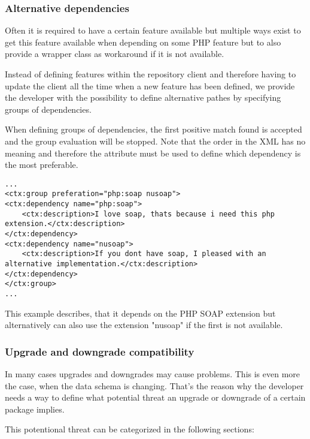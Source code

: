 \subsubsection[sec:alternative dependencies]{Alternative dependencies}
Often it is required to have a certain feature available but multiple ways exist to get this feature available when depending on some PHP feature but to also provide a wrapper class as workaround if it is not available.

Instead of defining features within the repository client and therefore having to update the client all the time when a new feature has been defined, we provide the developer with the possibility to define alternative pathes by specifying groups of dependencies.

When defining groups of dependencies, the first positive match found is accepted and the group evaluation will be stopped. Note that the order in the XML has no meaning and therefore the attribute  must be used to define which dependency is the most preferable.

\lstset{language=XML} 
\begin{lstlisting}[caption=XML example: alternative relationships]
...
<ctx:group preferation="php:soap nusoap">
<ctx:dependency name="php:soap">
    <ctx:description>I love soap, thats because i need this php extension.</ctx:description>
</ctx:dependency>
<ctx:dependency name="nusoap">
    <ctx:description>If you dont have soap, I pleased with an alternative implementation.</ctx:description>
</ctx:dependency>
</ctx:group>
...
\end{lstlisting}
This example describes, that it depends on the PHP SOAP extension but alternatively can also use the extension "nusoap" if the first is not available.

\subsubsection[sec:upgrade and downgrade compatibility]{Upgrade and downgrade compatibility}
In many cases upgrades and downgrades may cause problems. This is even more the case, when the data schema is changing.
That's the reason why the developer needs a way to define what potential threat an upgrade or downgrade of a certain package implies.

This potentional threat can be categorized in the following sections:

